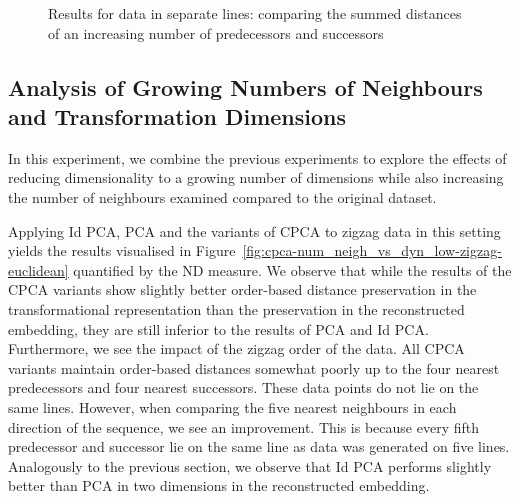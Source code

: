 \documentclass[pdftex,12pt,a4paper]{report}
\begin{document}
\begin{figure}
    \caption{Results for data in separate lines: comparing the summed distances of an increasing number of predecessors and successors}\label{fig:cpca_num_neigh-seplines}
\end{figure}

\FloatBarrier

\subsection{Analysis of Growing Numbers of Neighbours and Transformation Dimensions}
In this experiment, we combine the previous experiments to explore the effects of reducing dimensionality to a growing number of dimensions while also increasing the number of neighbours examined compared to the original dataset.

Applying Id PCA, PCA and the variants of CPCA to zigzag data in this setting yields the results visualised in Figure~\ref{fig:cpca-num_neigh_vs_dyn_low-zigzag-euclidean} quantified by the ND measure.
We observe that while the results of the CPCA variants show slightly better order-based distance preservation in the transformational representation than the preservation in the reconstructed embedding, they are still inferior to the results of PCA and Id PCA.
Furthermore, we see the impact of the zigzag order of the data.
All CPCA variants maintain order-based distances somewhat poorly up to the four nearest predecessors and four nearest successors.
These data points do not lie on the same lines.
However, when comparing the five nearest neighbours in each direction of the sequence, we see an improvement.
This is because every fifth predecessor and successor lie on the same line as data was generated on five lines.
Analogously to the previous section, we observe that Id PCA performs slightly better than PCA in two dimensions in the reconstructed embedding.
\end{document}
